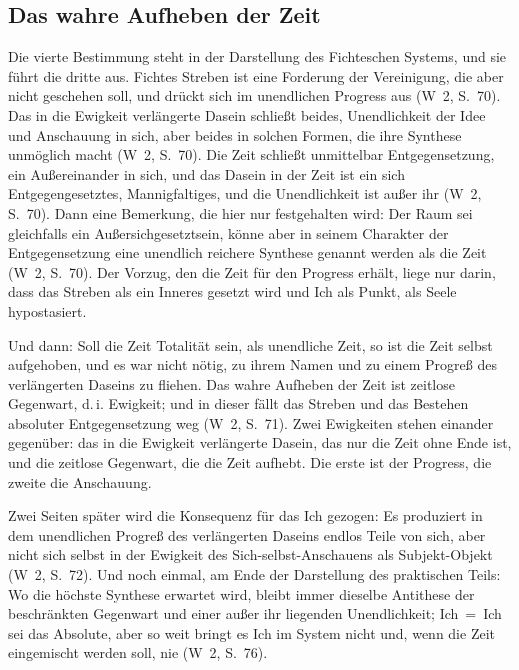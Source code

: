 \documentclass[11pt,a4paper]{article}
\newcommand{\SO}{Subjekt-Objekt}
\newcommand{\Werke}[1]{(W~2, S.~#1)}
\begin{document}
\subsection{Das wahre Aufheben der Zeit}

Die vierte Bestimmung steht in der Darstellung des Fichteschen Systems, und sie führt die dritte aus. Fichtes Streben ist eine Forderung der Vereinigung, \glqq die aber nicht geschehen soll\grqq{}, und drückt sich im unendlichen Progress aus \Werke{70}. \glqq Das in die Ewigkeit verlängerte Dasein schließt beides, Unendlichkeit der Idee und Anschauung in sich, aber beides in solchen Formen, die ihre Synthese unmöglich macht\grqq{} \Werke{70}. Die Zeit \glqq schließt unmittelbar Entgegensetzung, ein Außereinander in sich, und das Dasein in der Zeit ist ein sich Entgegengesetztes, Mannigfaltiges, und die Unendlichkeit ist außer ihr\grqq{} \Werke{70}. Dann eine Bemerkung, die hier nur festgehalten wird: Der Raum sei gleichfalls ein Außersichgesetztsein, könne aber \glqq in seinem Charakter der Entgegensetzung eine unendlich reichere Synthese genannt werden als die Zeit\grqq{} \Werke{70}. Der Vorzug, den die Zeit für den Progress erhält, liege nur darin, dass das Streben als ein Inneres gesetzt wird und Ich als Punkt, als Seele hypostasiert.

Und dann: \glqq Soll die Zeit Totalität sein, als unendliche Zeit, so ist die Zeit selbst aufgehoben, und es war nicht nötig, zu ihrem Namen und zu einem Progreß des verlängerten Daseins zu fliehen. Das wahre Aufheben der Zeit ist zeitlose Gegenwart, d.\,i. Ewigkeit; und in dieser fällt das Streben und das Bestehen absoluter Entgegensetzung weg\grqq{} \Werke{71}. Zwei Ewigkeiten stehen einander gegenüber: das in die Ewigkeit verlängerte Dasein, das nur die Zeit ohne Ende ist, und die zeitlose Gegenwart, die die Zeit aufhebt. Die erste ist der Progress, die zweite die Anschauung.

Zwei Seiten später wird die Konsequenz für das Ich gezogen: Es \glqq produziert in dem unendlichen Progreß des verlängerten Daseins endlos Teile von sich, aber nicht sich selbst in der Ewigkeit des Sich-selbst-Anschauens als \SO{}\grqq{} \Werke{72}. Und noch einmal, am Ende der Darstellung des praktischen Teils: Wo die höchste Synthese erwartet wird, bleibt \glqq immer dieselbe Antithese der beschränkten Gegenwart und einer außer ihr liegenden Unendlichkeit\grqq{}; Ich~=~Ich sei das Absolute, \glqq aber so weit bringt es Ich im System nicht und, wenn die Zeit eingemischt werden soll, nie\grqq{} \Werke{76}.
\end{document}

